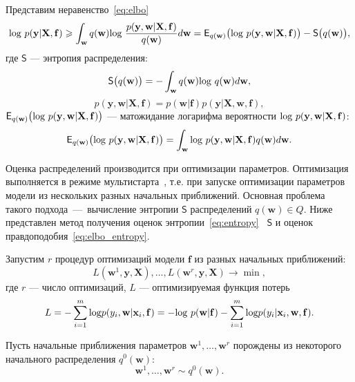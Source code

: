 \documentclass[12pt]{a&t}
\begin{document}
Представим неравенство~\eqref{eq:elbo}
\begin{equation}
\label{eq:elbo_entropy}
 \textnormal{log}~p(\mathbf{y}|\mathbf{X},\mathbf{f}) \geq \int_\mathbf{w} q(\mathbf{w})\textnormal{log}~\frac{p(\mathbf{y},\mathbf{w}|\mathbf{X}, \mathbf{f})}{q(\mathbf{w})}d\mathbf{w} =  \mathsf{E}_{q(\mathbf{w)}}\bigl(\textnormal{log~}p (\mathbf{y}, \mathbf{w}|\mathbf{X}, \mathbf{f})\bigr) - \mathsf{S}\bigl({q(\mathbf{w)}}\bigr),
\end{equation}
где $\mathsf{S}$ --- энтропия распределения:
\[
\mathsf{S}\bigl({q(\mathbf{w)}}\bigr) = - \int_{\mathbf{w}} q(\mathbf{w})\textnormal{log}~q(\mathbf{w})d\mathbf{w},
\]
$$p (\mathbf{y}, \mathbf{w}|\mathbf{X}, \mathbf{f}) = p (\mathbf{w}| \mathbf{f}) p (\mathbf{y}|\mathbf{X}, \mathbf{w}, \mathbf{f}),$$
$\mathsf{E}_{q(\mathbf{w)}}\bigl(\textnormal{log~}p (\mathbf{y}, \mathbf{w}|\mathbf{X}, \mathbf{f})\bigr)$ --- матожидание логарифма вероятности $\textnormal{log~}p (\mathbf{y}, \mathbf{w}|\mathbf{X}, \mathbf{f})$:
\[
	\mathsf{E}_{q(\mathbf{w)}}\bigl(\textnormal{log~}p (\mathbf{y}, \mathbf{w}|\mathbf{X}, \mathbf{f})\bigr) = \int_\mathbf{w} \textnormal{log~}p (\mathbf{y}, \mathbf{w}|\mathbf{X}, \mathbf{f}) q(\mathbf{w}) d\mathbf{w}.
\]

Оценка распределений производится при оптимизации параметров. Оптимизация выполняется в режиме мультистарта~\cite{multi}, т.е. при запуске оптимизации параметров модели из нескольких разных начальных приближений. Основная проблема такого подхода~---~вычисление энтропии $\mathsf{S}$ распределений $q(\mathbf{w}) \in Q$. Ниже представлен метод получения оценок энтропии~\eqref{eq:entropy} ~$\mathsf{S}$ и оценок правдоподобия~\eqref{eq:elbo_entropy}.

Запустим $r$ процедур оптимизаций модели $\mathbf{f}$ из разных начальных приближений:
\[
	L(\mathbf{w}^1, \mathbf{y}, \mathbf{X}), \dots, L(\mathbf{w}^r, \mathbf{y}, \mathbf{X}) \to \min,
\] 
где $r$ --- число оптимизаций, $L$ --- оптимизируемая функция потерь
\begin{equation}
\label{eq:loss_func}
L = -\sum_{i=1}^m \textnormal{log}p({y}_i, \mathbf{w} |\mathbf{x}_i, \mathbf{f}) = -\textnormal{log}~p(\mathbf{w}|\mathbf{f}) - \sum_{i=1}^m \textnormal{log}p({y}_i |\mathbf{x}_i, \mathbf{w}, \mathbf{f}).
\end{equation}

Пусть начальные приближения параметров $\mathbf{w}^1, \dots, \mathbf{w}^r$ порождены из некоторого начального распределения $q^0(\mathbf{w})$:
\[
	\mathbf{w}^1, \dots, \mathbf{w}^r \sim q^0(\mathbf{w}). 
\]
\end{document}
